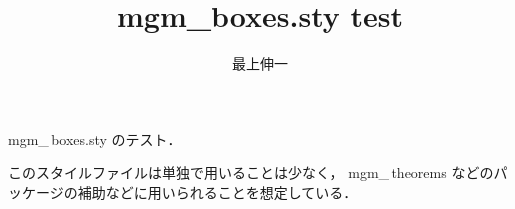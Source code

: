 \documentclass{jsarticle}
\title{mgm_boxes.sty test}
\author{最上伸一}
\begin{document}
mgm\_\,boxes.sty のテスト．

このスタイルファイルは単独で用いることは少なく，
mgm\_\,theorems などのパッケージの補助などに用いられることを想定している．
\end{document}
